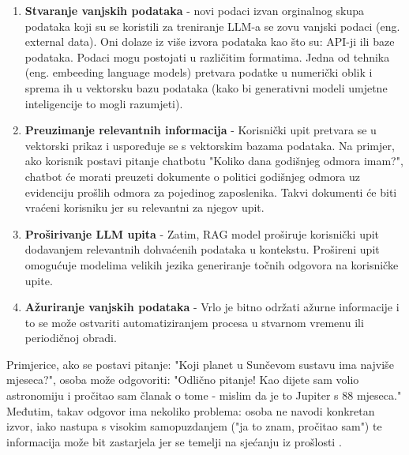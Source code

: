 \documentclass[]{foi}
\begin{document}
\begin{enumerate}
    \item \textbf{Stvaranje vanjskih podataka} - novi podaci izvan orginalnog skupa podataka koji su se koristili za treniranje LLM-a se zovu 
    vanjski podaci (eng. external data). Oni dolaze iz više izvora podataka kao što su: API-ji ili baze podataka. Podaci mogu postojati u različitim formatima.
    Jedna od tehnika (eng. embeeding language models) pretvara podatke u numerički oblik i sprema ih u vektorsku bazu podataka 
    (kako bi generativni modeli umjetne inteligencije to mogli razumjeti).
    \item \textbf{Preuzimanje relevantnih informacija} - Korisnički upit pretvara se u vektorski prikaz i uspoređuje se s vektorskim bazama podataka.
    Na primjer, ako korisnik postavi pitanje chatbotu "Koliko dana godišnjeg odmora imam?", chatbot će morati preuzeti dokumente o politici godišnjeg 
    odmora uz evidenciju prošlih odmora za pojedinog zaposlenika. Takvi dokumenti će biti vraćeni korisniku jer su relevantni za njegov upit.
    \item \textbf{Proširivanje LLM upita} - Zatim, RAG model proširuje korisnički upit dodavanjem relevantnih dohvaćenih podataka u kontekstu. 
    Prošireni upit omogućuje modelima velikih jezika generiranje točnih odgovora na korisničke upite.
    \item \textbf{Ažuriranje vanjskih podataka} - Vrlo je bitno održati ažurne informacije i to se može ostvariti automatiziranjem procesa u stvarnom vremenu ili periodičnoj obradi. 
\end{enumerate}

Primjerice, ako se postavi pitanje: "Koji planet u Sunčevom sustavu ima najviše mjeseca?", osoba može odgovoriti: "Odlično pitanje! Kao dijete sam volio astronomiju i pročitao sam članak o tome
- mislim da je to Jupiter s 88 mjeseca." Međutim, takav odgovor ima nekoliko problema: osoba ne navodi konkretan izvor, iako nastupa s visokim samopuzdanjem ("ja to znam, pročitao sam")
te informacija može bit zastarjela jer se temelji na sjećanju iz prošlosti \cite{ibm2023rag}.
\end{document}
